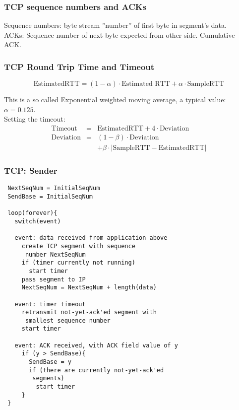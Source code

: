 \documentclass[10pt, a4paper, twocolumn]{scrartcl}
\begin{document}
\subsubsection{TCP sequence numbers and ACKs}

Sequence numbers: byte stream ''number'' of first byte in segment's data.\\
ACKs: Sequence number of next byte expected from other side. Cumulative ACK.

\subsubsection{TCP Round Trip Time and Timeout}

\begin{displaymath}
	\mbox{EstimatedRTT} = (1-\alpha)\cdotp \mbox{Estimated RTT}+\alpha\cdotp\mbox{SampleRTT}
\end{displaymath}

This is a so called Exponential weighted moving average, a typical value: $\alpha = 0.125$.\\

Setting the timeout:
\begin{eqnarray}
	\mbox{Timeout} &	= &	\mbox{EstimatedRTT} + 4\cdotp\mbox{Deviation} \nonumber \\
	\mbox{Deviation} &	= &	(1-\beta)\cdotp \mbox{Deviation} \nonumber \\
	 &			&	+ \beta\cdotp|\mbox{SampleRTT}-\mbox{EstimatedRTT}| \nonumber
\end{eqnarray}

\subsubsection{TCP: Sender}

\begin{verbatim}
 NextSeqNum = InitialSeqNum
 SendBase = InitialSeqNum

 loop(forever){
   switch(event)

   event: data received from application above
     create TCP segment with sequence
      number NextSeqNum
     if (timer currently not running)
       start timer
     pass segment to IP
     NextSeqNum = NextSeqNum + length(data)

   event: timer timeout
     retransmit not-yet-ack'ed segment with
      smallest sequence number
     start timer

   event: ACK received, with ACK field value of y
     if (y > SendBase){
       SendBase = y
       if (there are currently not-yet-ack'ed
        segments)
         start timer
     }
 }
\end{verbatim}
\end{document}
